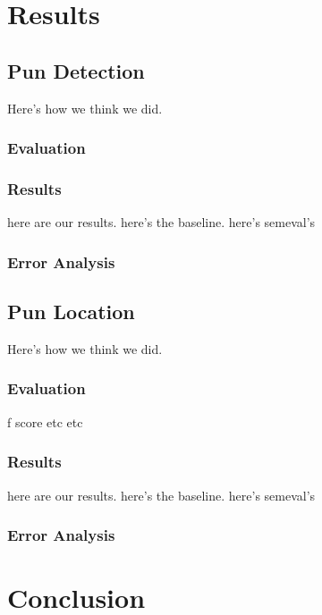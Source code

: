 \documentclass{article}
\begin{document}
\section{Results}
\label{results}

\subsection{Pun Detection}
Here's how we think we did.
\subsubsection{Evaluation}
\subsubsection{Results}
here are our results. here's the baseline. here's semeval's

\subsubsection{Error Analysis}

\subsection{Pun Location}
Here's how we think we did.
\subsubsection{Evaluation}
f score etc etc
\subsubsection{Results}
here are our results. here's the baseline. here's semeval's
\subsubsection{Error Analysis}


\section{Conclusion}
\label{conclusion}
\end{document}
